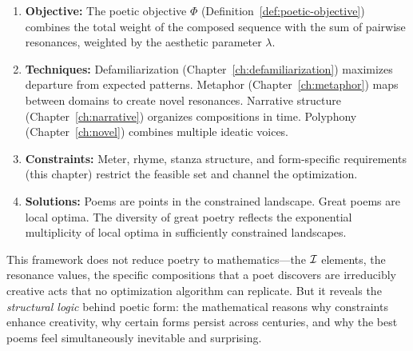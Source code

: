 \begin{enumerate}
  \item \textbf{Objective:} The poetic objective $\Phi$ (Definition~\ref{def:poetic-objective})
    combines the total weight of the composed sequence with the sum of pairwise
    resonances, weighted by the aesthetic parameter $\lambda$.

  \item \textbf{Techniques:} Defamiliarization (Chapter~\ref{ch:defamiliarization})
    maximizes departure from expected patterns.  Metaphor (Chapter~\ref{ch:metaphor})
    maps between domains to create novel resonances.  Narrative structure
    (Chapter~\ref{ch:narrative}) organizes compositions in time.  Polyphony
    (Chapter~\ref{ch:novel}) combines multiple ideatic voices.

  \item \textbf{Constraints:} Meter, rhyme, stanza structure, and form-specific
    requirements (this chapter) restrict the feasible set and channel the
    optimization.

  \item \textbf{Solutions:} Poems are points in the constrained landscape.
    Great poems are local optima.  The diversity of great poetry reflects the
    exponential multiplicity of local optima in sufficiently constrained landscapes.
\end{enumerate}

This framework does not reduce poetry to mathematics---the $\mathcal{I}$ elements,
the resonance values, the specific compositions that a poet discovers are
irreducibly creative acts that no optimization algorithm can replicate.  But
it reveals the \emph{structural logic} behind poetic form: the mathematical
reasons why constraints enhance creativity, why certain forms persist across
centuries, and why the best poems feel simultaneously inevitable and
surprising.

